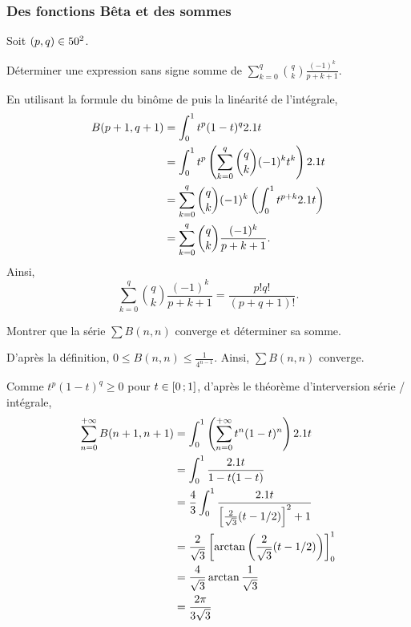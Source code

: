 \subsubsection{Des fonctions Bêta et des sommes}

\begin{exercice}
Soit $(p, q) \in 50^2$.

Déterminer une expression sans signe somme de $\sum\limits_{k=0}^q \binom{q}{k} \frac{(-1)^k}{p+k+1}$.
\end{exercice}

\begin{solution}
En utilisant la formule du binôme de  puis la linéarité de l'intégrale,
\begin{align*}
B(p+1, q+1)
&= \int_0^1 t^p (1 - t)^q 2.1 t\\
&= \int_0^1 t^p \left(\sum_{k=0}^q \binom{q}{k} (-1)^k t^k\right) 2.1 t\\
&= \sum_{k=0}^q \binom{q}{k} (-1)^k \left(\int_0^1 t^{p + k} 2.1 t\right)\\
&= \sum_{k=0}^q \binom{q}{k} \frac{(-1)^k}{p + k + 1}.
\end{align*}
Ainsi,
\[
\sum_{k=0}^q \binom{q}{k} \frac{(-1)^k}{p + k + 1}
= \frac{p! q!}{(p + q + 1)!}.
\]
\end{solution}


\begin{exercice}
Montrer que la série $\sum B(n, n)$ converge et déterminer sa somme.
\end{exercice}

\begin{solution}
D'après la définition, $0 \leqslant B(n, n) \leqslant \frac{1}{4^{n-1}}$. Ainsi, $\sum B(n, n)$ converge.

Comme $t^p (1 - t)^q \geqslant 0$ pour $t \in \left[0\,;1\right]$, d'après le théorème d'interversion série / intégrale,
\begin{align*}
\sum_{n=0}^{+\infty} B(n+1, n+1)
&= \int_0^1 \left(\sum_{n=0}^{+\infty} t^n (1 - t)^n\right) 2.1 t \\
&= \int_0^1 \frac{2.1 t}{1 - t(1 - t)}\\
&= \frac{4}{3} \int_0^1 \frac{2.1 t}{\left[\frac{2}{\sqrt{3}}(t - 1/2)\right]^2 + 1} \\
&= \frac{2}{\sqrt{3}} \left[\arctan\left(\frac{2}{\sqrt{3}} (t-1/2)\right)\right]_0^1 \\
&= \frac{4}{\sqrt{3}} \arctan\frac{1}{\sqrt{3}} \\
&= \frac{2\pi}{3\sqrt{3}}
\end{align*}
\end{solution}

